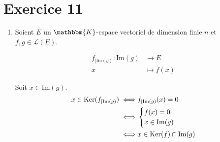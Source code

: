 \part{Exercice 11}

\begin{enumerate}
	\item 
		Soient $E$ un $\mathbbm{K}$-espace vectoriel de dimension finie $n$ et $f,g \in \mathcal{L}(E)$.

		\begin{align*}
			f_{|\mathrm{Im}(g)}: \mathrm{Im}(g) &\longrightarrow E \\
			x &\longmapsto f(x)
		\end{align*}

		Soit $x \in \mathrm{Im}(g)$.
		\begin{align*}
			x \in \operatorname{Ker}(f_{|\mathrm{Im}(g)}) \iff& f_{|\mathrm{Im}(g)}(x) = 0\\
			\iff& \begin{cases}
				f(x) = 0\\
				x \in \mathrm{Im}(g)
			\end{cases}\\
			\iff& x \in \operatorname{Ker}(f) \cap \mathrm{Im}(g)
		\end{align*}


\end{enumerate}
